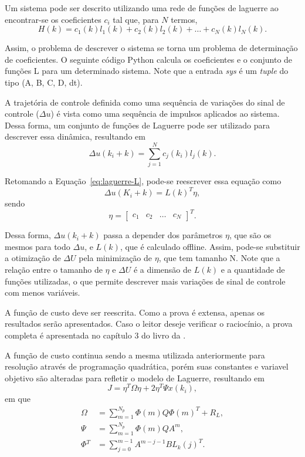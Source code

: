 Um sistema pode ser descrito utilizando uma rede de funções de laguerre ao
encontrar-se os coeficientes \(c_i\) tal que, para \(N\) termos,
%
\begin{equation}
	H(k) = c_{1}(k)l_{1}(k) + c_{2}(k)l_{2}(k) + \hdots{} + c_{N}(k)l_{N}(k).
\end{equation}

Assim, o problema de descrever o sistema se torna um problema de determinação de
coeficientes. O seguinte código Python calcula os coeficientes e o conjunto de
funções L para um determinado sistema. Note que a entrada \textit{sys} é um
\textit{tuple} do tipo (A, B, C, D, dt).


A trajetória de controle definida como uma sequência de variações do sinal de
controle (\(\Delta{}u\)) é vista como uma sequência de impulsos aplicados ao
sistema. Dessa forma, um conjunto de funções de Laguerre pode ser utilizado para
descrever essa dinâmica, resultando em
%
\begin{equation}
	\Delta{}u(k_i+k) = \sum^{N}_{j=1}{c_j(k_i)l_j(k)}.
\end{equation}

Retomando a Equação~\eqref{eq:laguerre-L}, pode-se reescrever essa equação como
%
\begin{equation}
	\Delta{}u(K_i + k) = {L(k)}^{T}\eta{},
\end{equation}
%
sendo
%
\begin{equation}
	\eta{} = \begin{bmatrix} c_1 & c_2 & \hdots{} & c_N \end{bmatrix}^T.
\end{equation}

Dessa forma, \(\Delta{}u(k_i+k)\) passa a depender dos parâmetros \(\eta{}\),
que são os mesmos para todo \(\Delta{}u\), e \(L(k)\), que é calculado offline.
Assim, pode-se substituir a otimização de \(\Delta{}U\) pela minimização de
\(\eta{}\), que tem tamanho N. Note que a relação entre o tamanho de \(\eta{}\)
e \(\Delta{}U\) é a dimensão de \(L(k)\) e a quantidade de funções utilizadas, o
que permite descrever mais variações de sinal de controle com menos variáveis.

A função de custo deve ser reescrita. Como a prova é extensa, apenas os
resultados serão apresentados. Caso o leitor deseje verificar o raciocínio, a
prova completa é apresentada no capítulo 3 do livro da \textcite{book:wang}.

A função de custo continua sendo a mesma utilizada anteriormente para resolução
através de programação quadrática, porém suas constantes e variavel objetivo
são alteradas para refletir o modelo de Laguerre, resultando em
%
\begin{equation}
	J = \eta{}^{T}\Omega{}\eta{} + 2\eta{}^{T}\Psi{}x(k_i),
\end{equation}
%
em que
%
\begin{align}
	\Omega{} & = \sum^{N_p}_{m=1}{\Phi{}(m)Q\Phi{}{(m)}^{T}+R_{L}}, \\
	\Psi{}   & = \sum^{N_p}_{m=1}{\Phi{}(m)QA^m},                   \\
	\Phi{}^T & = \sum^{m-1}_{j=0}{A^{m-j-1}BL_{k}{(j)}^{T}}.
\end{align}

